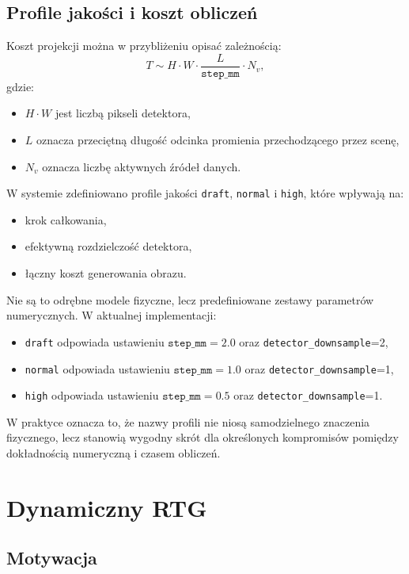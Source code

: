 \documentclass[11pt,a4paper]{article}
\begin{document}
\subsection{Profile jakości i koszt obliczeń}

Koszt projekcji można w przybliżeniu opisać zależnością:
\[
  T \sim H\cdot W \cdot \frac{L}{\texttt{step\_mm}} \cdot N_v,
\]
gdzie:
\begin{itemize}
\item \(H\cdot W\) jest liczbą pikseli detektora,
\item \(L\) oznacza przeciętną długość odcinka promienia przechodzącego przez scenę,
\item \(N_v\) oznacza liczbę aktywnych źródeł danych.
\end{itemize}

W systemie zdefiniowano profile jakości \texttt{draft}, \texttt{normal} i
\texttt{high}, które wpływają na:
\begin{itemize}
\item krok całkowania,
\item efektywną rozdzielczość detektora,
\item łączny koszt generowania obrazu.
\end{itemize}

Nie są to odrębne modele fizyczne, lecz predefiniowane zestawy parametrów
numerycznych. W aktualnej implementacji:
\begin{itemize}
\item \texttt{draft} odpowiada ustawieniu \(\texttt{step\_mm}=2.0\) oraz
      \texttt{detector\_downsample}=2,
\item \texttt{normal} odpowiada ustawieniu \(\texttt{step\_mm}=1.0\) oraz
      \texttt{detector\_downsample}=1,
\item \texttt{high} odpowiada ustawieniu \(\texttt{step\_mm}=0.5\) oraz
      \texttt{detector\_downsample}=1.
\end{itemize}
W praktyce oznacza to, że nazwy profili nie niosą samodzielnego znaczenia
fizycznego, lecz stanowią wygodny skrót dla określonych kompromisów pomiędzy
dokładnością numeryczną i czasem obliczeń.

\section{Dynamiczny RTG}

\subsection{Motywacja}
\end{document}
